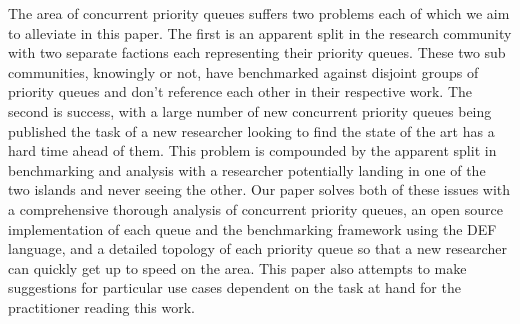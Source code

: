 The area of concurrent priority queues suffers two problems each of which we aim to alleviate in this paper. The first is an apparent split in the research community with two separate factions each representing their priority queues. These two sub communities, knowingly or not, have benchmarked against disjoint  groups of priority queues and don't reference each other in their respective work. The second is success, with a large number of new concurrent priority queues being published the task of a new researcher looking to find the state of the art has a hard time ahead of them. This problem is compounded by the apparent split in benchmarking and analysis with a researcher potentially landing in one of the two islands and never seeing the other. Our paper solves both of these issues with a comprehensive thorough analysis of concurrent priority queues, an open source implementation of each queue and the benchmarking framework using the DEF language, and a detailed topology of each priority queue so that a new researcher can quickly get up to speed on the area. This paper also attempts to make suggestions for particular use cases dependent on the task at hand for the practitioner reading this work.